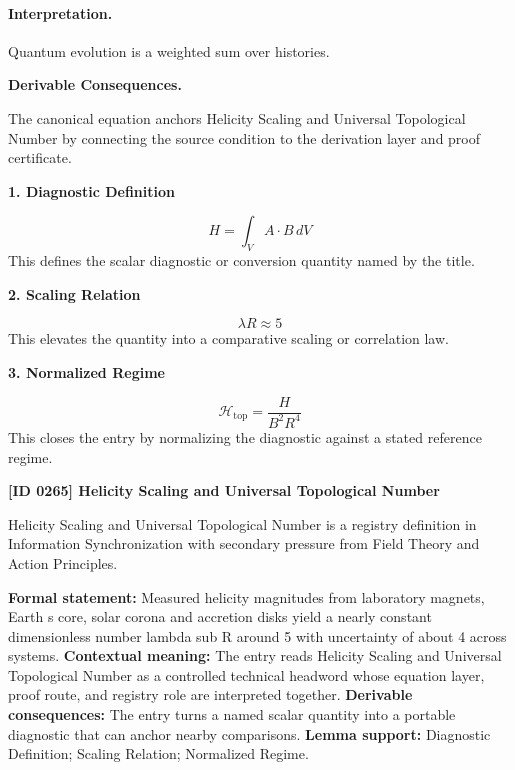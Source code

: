 \paragraph{Interpretation.}
Quantum evolution is a weighted sum over histories.

\par\vspace{0.35em}
\noindent\textbf{Derivable Consequences.}\quad
\begingroup
\footnotesize
\raggedright
The canonical equation anchors Helicity Scaling and Universal Topological Number by connecting the source condition to the derivation layer and proof certificate.
\par\endgroup

\noindent\textbf{1. Diagnostic Definition}\par
\[
H=\int_V A\cdot B\,dV
\]
\noindent This defines the scalar diagnostic or conversion quantity named by the title.\par
\noindent\textbf{2. Scaling Relation}\par
\[
\lambda R\approx 5
\]
\noindent This elevates the quantity into a comparative scaling or correlation law.\par
\noindent\textbf{3. Normalized Regime}\par
\[
\mathcal{H}_{\mathrm{top}}=\frac{H}{B^2R^4}
\]
\noindent This closes the entry by normalizing the diagnostic against a stated reference regime.\par

\clearpage
\noindent\textbf{[ID 0265] Helicity Scaling and Universal Topological Number}\par
\vspace{0.35em}
\begingroup\small
{}
Helicity Scaling and Universal Topological Number is a registry definition in Information Synchronization with secondary pressure from Field Theory and Action Principles.

\begingroup\footnotesize\setlength{\emergencystretch}{3em}\sloppy
\textbf{Formal statement:} Measured helicity magnitudes from laboratory magnets, Earth s core, solar corona and accretion disks yield a nearly constant dimensionless number lambda sub R around 5 with uncertainty of about 4 across systems. \textbf{Contextual meaning:} The entry reads Helicity Scaling and Universal Topological Number as a controlled technical headword whose equation layer, proof route, and registry role are interpreted together. \textbf{Derivable consequences:} The entry turns a named scalar quantity into a portable diagnostic that can anchor nearby comparisons. \textbf{Lemma support:} Diagnostic Definition; Scaling Relation; Normalized Regime.\par
\endgroup

